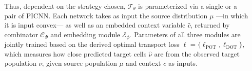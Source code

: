 Thus, dependent on the strategy chosen, $\mathcal{T}_{\theta}$ is parameterized via a single or a pair of PICNN. Each network takes as input the source distribution $\mu$ ---in which it is input convex--- as well as an embedded context variable $\hat{c}$, returned by combinator $\mathcal{C}_\Phi$ and embedding module $\mathcal{E}_\phi$.
Parameters of all three modules are jointly trained based on the derived optimal transport loss $\ell = \{\ell_\text{POT}, \ell_\text{DOT}\}$, which measures how close predicted target cells $\hat{\nu}$ are from the observed target population $\nu$, given source population $\mu$ and context $c$ as inputs.


%

